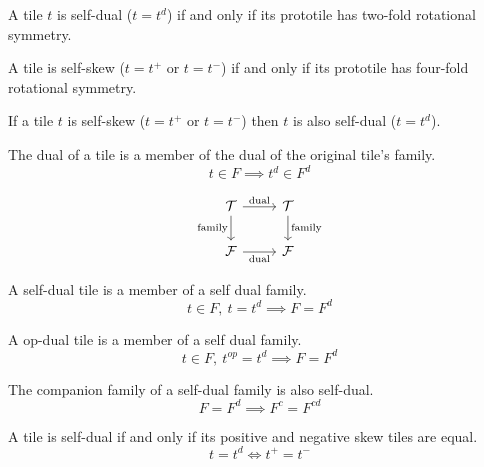 \documentclass{tufte-book}
\begin{document}
\begin{theorem}
A tile $t$ is self-dual ($t = t^d$) if and only if its prototile has two-fold rotational symmetry.      
\end{theorem}

\begin{theorem}
A tile is self-skew ($t=t^+$ or $t=t^-$) if and only if its prototile has four-fold rotational symmetry.
\end{theorem}

\begin{theorem}
If a tile $t$ is self-skew ($t=t^+$ or $t=t^-$) then $t$ is also self-dual ($t = t^d$).
\end{theorem}

\begin{theorem}
The dual of a tile is a member of the dual of the original tile's family.
$$t\in F \implies t^d \in F^d$$  
\end{theorem}

\begin{marginfigure}
\[
\begin{tikzcd}
	{\mathcal{T}} & {\mathcal{T}} \\
	{\mathcal{F}} & {\mathcal{F}}
	\arrow["{\small\text{dual}}", from=1-1, to=1-2]
	\arrow["{\small\text{family}}"', from=1-1, to=2-1]
	\arrow["{\small\text{family}}", from=1-2, to=2-2]
	\arrow["{\small\text{dual}}"', from=2-1, to=2-2]
\end{tikzcd}
\]
\end{marginfigure}

\begin{theorem}
A self-dual tile is a member of a self dual family. 
$$t\in F, \: t=t^d \implies F = F^d$$     
\end{theorem}

\begin{theorem}
A op-dual tile is a member of a self dual family.  
$$t\in F, \: t^{op}=t^d \implies F = F^d$$     
\end{theorem}

\begin{theorem}
The companion family of a self-dual family is also self-dual.  
$$F = F^d \implies F^c = F^{cd}$$     
\end{theorem}

\begin{theorem}
A tile is self-dual if and only if its  positive and negative skew tiles are equal. 
$$t = t^d \iff t^+ = t^-$$
\end{theorem}
\end{document}
